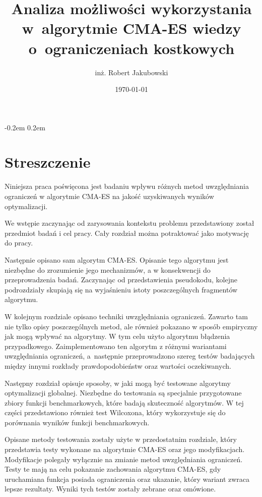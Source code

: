 \documentclass{mini}
\title{Analiza możliwości wykorzystania w~algorytmie CMA-ES wiedzy o~ograniczeniach kostkowych}
\author{inż. Robert Jakubowski}
\date{\today}
\begin{document}
\maketitle

\pagebreak
\thispagestyle{empty}

\openup -0.2em %
\tableofcontents
\openup 0.2em %

\thispagestyle{empty}
\raggedbottom
\pagebreak


\section{Streszczenie}

\hspace{3,4ex}Niniejsza praca poświęcona jest badaniu wpływu różnych metod uwzględniania ograniczeń w algorytmie CMA-ES na jakość uzyskiwanych wyników optymalizacji.

We wstępie zaczynając od zarysowania kontekstu problemu przedstawiony został przedmiot badań i cel pracy. Cały rozdział można potraktować jako motywację do pracy.

Następnie opisano sam algorytm CMA-ES. Opisanie tego algorytmu jest niezbędne do zrozumienie jego mechanizmów, a w konsekwencji do przeprowadzenia badań. Zaczynając od przedstawienia pseudokodu, kolejne podrozdziały skupiają się na wyjaśnieniu istoty poszczególnych fragmentów algorytmu. 

W kolejnym rozdziale opisano techniki uwzględniania ograniczeń. Zawarto tam nie tylko opisy poszczególnych metod, ale również pokazano w sposób empiryczny jak mogą wpływać na algorytmy. W tym celu użyto algorytmu błądzenia przypadkowego. Zaimplementowano ten algorytm z różnymi wariantami uwzględniania ograniczeń, a~następnie przeprowadzono szereg testów badających między innymi rozkłady prawdopodobieństw oraz wartości oczekiwanych.

Następny rozdział opisuje sposoby, w jaki mogą być testowane algorytmy optymalizacji globalnej. Niezbędne do testowania są specjalnie przygotowane zbiory funkcji benchmarkowych, które badają skuteczność algorytmów. W tej części przedstawiono również test Wilcoxona, który wykorzystuje się do porównania wyników funkcji benchmarkowych.

Opisane metody testowania zostały użyte w przedostatnim rozdziale, który przedstawia testy wykonane na algorytmie CMA-ES oraz jego modyfikacjach. Modyfikacje polegały wyłącznie na zmianie metod uwzględniania ograniczeń. Testy te mają na celu pokazanie zachowania algorytmu CMA-ES, gdy uruchamiana funkcja posiada ograniczenia oraz ukazanie, który wariant zwraca lepsze rezultaty. Wyniki tych testów zostały zebrane oraz omówione.
\end{document}
